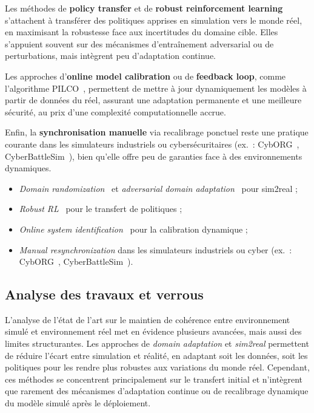 Les méthodes de \textbf{policy transfer} et de \textbf{robust reinforcement learning}~\cite{pinto2017robust} s’attachent à transférer des politiques apprises en simulation vers le monde réel, en maximisant la robustesse face aux incertitudes du domaine cible. Elles s’appuient souvent sur des mécanismes d'entraînement adversarial ou de perturbations, mais intègrent peu d'adaptation continue.

Les approches d’\textbf{online model calibration} ou de \textbf{feedback loop}, comme l’algorithme PILCO~\cite{deisenroth2011pilco}, permettent de mettre à jour dynamiquement les modèles à partir de données du réel, assurant une adaptation permanente et une meilleure sécurité, au prix d'une complexité computationnelle accrue.

Enfin, la \textbf{synchronisation manuelle} via recalibrage ponctuel reste une pratique courante dans les simulateurs industriels ou cybersécuritaires (ex.~: CybORG~\cite{Standen2021}, CyberBattleSim~\cite{cyberbattlesim}), bien qu'elle offre peu de garanties face à des environnements dynamiques.

\begin{itemize}
  \item \textit{Domain randomization}~\cite{tobin2017domain} et \textit{adversarial domain adaptation}~\cite{ganin2016domain} pour sim2real ;
  \item \textit{Robust RL}~\cite{pinto2017robust} pour le transfert de politiques ;
  \item \textit{Online system identification}~\cite{deisenroth2011pilco} pour la calibration dynamique ;
  \item \textit{Manual resynchronization} dans les simulateurs industriels ou cyber (ex.~: CybORG~\cite{Standen2021}, CyberBattleSim~\cite{cyberbattlesim}).
\end{itemize}


\subsection*{Analyse des travaux et verrous}

L’analyse de l’état de l’art sur le maintien de cohérence entre environnement simulé et environnement réel met en évidence plusieurs avancées, mais aussi des limites structurantes. Les approches de \textit{domain adaptation} et \textit{sim2real} permettent de réduire l’écart entre simulation et réalité, en adaptant soit les données, soit les politiques pour les rendre plus robustes aux variations du monde réel. Cependant, ces méthodes se concentrent principalement sur le transfert initial et n’intègrent que rarement des mécanismes d’adaptation continue ou de recalibrage dynamique du modèle simulé après le déploiement.


